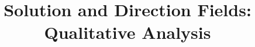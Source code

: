 \documentclass{beamer}
\title[Section 1.2]{Solution and Direction Fields: Qualitative Analysis}
\begin{document}
\begin{frame}
\titlepage
\end{frame}
\end{document}
